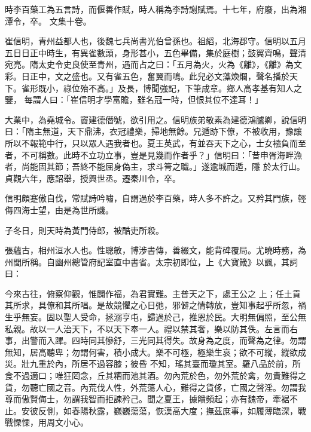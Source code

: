 \begin{pinyinscope}
 時李百藥工為五言詩，而偃善作賦，時人稱為李詩謝賦焉。十七年，府廢，出為湘潭令，卒。
 文集十卷。



 崔信明，青州益都人也，後魏七兵尚書光伯曾孫也。祖縚，北海郡守。信明以五月五日日正中時生，有異雀數頭，身形甚小，五色畢備，集於庭樹；鼓翼齊鳴，聲清宛亮。隋太史令史良使至青州，遇而占之曰：「五月為火，火為《離》，《離》為文彩。日正中，文之盛也。又有雀五色，奮翼而鳴。此兒必文藻煥爛，聲名播於天下。雀形既小，祿位殆不高。」及長，博聞強記，下筆成章。鄉人高孝基有知人之鑒，
 每謂人曰：「崔信明才學富贍，雖名冠一時，但恨其位不達耳！」



 大業中，為堯城令。竇建德僭號，欲引用之。信明族弟敬素為建德鴻臚卿，說信明曰：「隋主無道，天下鼎沸，衣冠禮樂，掃地無餘。兄遁跡下僚，不被收用，豫讓所以不報範中行，只以眾人遇我者也。夏王英武，有並吞天下之心，士女襁負而至者，不可稱數。此時不立功立事，豈是見幾而作者乎？」信明曰：「昔申胥海畔漁者，尚能固其節；吾終不能屈身偽主，求斗筲之職。」遂逾城而遁，隱
 於太行山。貞觀六年，應詔舉，授興世丞。遷秦川令，卒。



 信明頗蹇傲自伐，常賦詩吟嘯，自謂過於李百藥，時人多不許之。又矜其門族，輕侮四海士望，由是為世所譏。



 子冬日，則天時為黃門侍郎，被酷吏所殺。



 張蘊古，相州洹水人也。性聰敏，博涉書傳，善綴文，能背碑覆局。尤曉時務，為州閭所稱。自幽州總管府記室直中書省。太宗初即位，上《大寶箴》以諷，其詞曰：



 今來古往，俯察仰觀，惟闢作福，為君實難。主普天之下，處王公之
 上；任土貢其所求，具僚和其所唱。是故競懼之心日弛，邪僻之情轉放，豈知事起乎所忽，禍生乎無妄。固以聖人受命，拯溺亨屯，歸過於己，推恩於民。大明無偏照，至公無私親。故以一人治天下，不以天下奉一人。禮以禁其奢，樂以防其佚。左言而右事，出警而入蹕。四時同其慘舒，三光同其得失。故身為之度，而聲為之律。勿謂無知，居高聽卑；勿謂何害，積小成大。樂不可極，極樂生哀；欲不可縱，縱欲成災。壯九重於內，所居不過容膝；彼昏
 不知，瑤其臺而瓊其室。羅八品於前，所食不過適口；唯狂罔念，丘其糟而池其酒。勿內荒於色，勿外荒於禽，勿貴難得之貨，勿聽亡國之音。內荒伐人性，外荒蕩人心，難得之貨侈，亡國之聲淫。勿謂我尊而傲賢侮士，勿謂我智而拒諫矜己。聞之夏王，據饋頻起；亦有魏帝，牽裾不止。安彼反側，如春陽秋露，巍巍蕩蕩，恢漢高大度；撫茲庶事，如履薄臨深，戰戰慄慄，用周文小心。




\end{pinyinscope}
